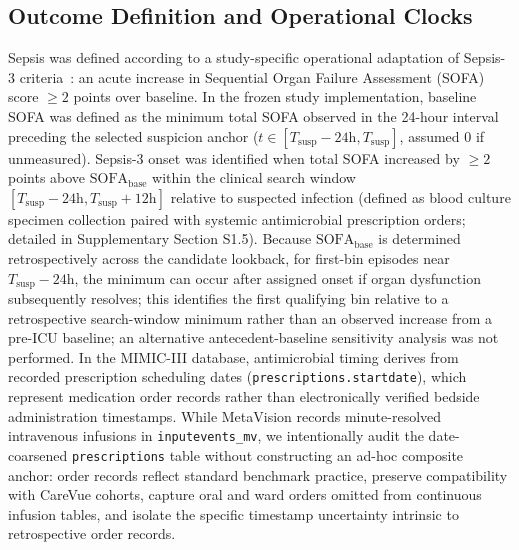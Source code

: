 \documentclass[10pt,twocolumn,a4paper]{article}
\begin{document}
\subsection{Outcome Definition and Operational Clocks}
Sepsis was defined according to a study-specific operational adaptation of Sepsis-3 criteria~\cite{singer2016sepsis,seymour2016assessment}: an acute increase in Sequential Organ Failure Assessment (SOFA) score $\ge 2$ points over baseline. In the frozen study implementation, baseline SOFA was defined as the minimum total SOFA observed in the 24-hour interval preceding the selected suspicion anchor ($t \in [T_{\mathrm{susp}} - 24\mathrm{h}, T_{\mathrm{susp}}]$, assumed 0 if unmeasured). Sepsis-3 onset was identified when total SOFA increased by $\ge 2$ points above $\text{SOFA}_{\text{base}}$ within the clinical search window $[T_{\mathrm{susp}} - 24\text{h}, T_{\mathrm{susp}} + 12\text{h}]$ relative to suspected infection (defined as blood culture specimen collection paired with systemic antimicrobial prescription orders; detailed in Supplementary Section S1.5). Because $\text{SOFA}_{\text{base}}$ is determined retrospectively across the candidate lookback, for first-bin episodes near $T_{\mathrm{susp}}-24\mathrm{h}$, the minimum can occur after assigned onset if organ dysfunction subsequently resolves; this identifies the first qualifying bin relative to a retrospective search-window minimum rather than an observed increase from a pre-ICU baseline; an alternative antecedent-baseline sensitivity analysis was not performed. In the MIMIC-III database, antimicrobial timing derives from recorded prescription scheduling dates (\texttt{prescriptions.\allowbreak startdate}), which represent medication order records rather than electronically verified bedside administration timestamps. While MetaVision records minute-resolved intravenous infusions in \texttt{inputevents\_mv}, we intentionally audit the date-coarsened \texttt{prescriptions} table without constructing an ad-hoc composite anchor: order records reflect standard benchmark practice, preserve compatibility with CareVue cohorts, capture oral and ward orders omitted from continuous infusion tables, and isolate the specific timestamp uncertainty intrinsic to retrospective order records.
\end{document}
